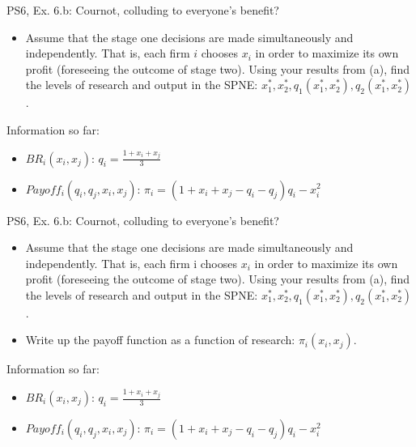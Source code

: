 \begin{frame}{PS6, Ex. 6.b: Cournot, colluding to everyone's benefit?}
    \begin{itemize}
    \item[(b)] Assume that the stage one decisions are made simultaneously and independently. That is, each firm $i$ chooses $x_i$ in order to maximize its own profit (foreseeing the outcome of stage two). Using your results from (a), find the levels of research and output in the SPNE: $x_1^*,x_2^*,q_1(x_1^*,x_2^*),q_2(x_1^*,x_2^*)$.
    \end{itemize}
  \begin{multicols}{2}
    \vfill\null \columnbreak
    Information so far:
    \begin{itemize}
    \item[1] $BR_i(x_i,x_j)$: $q_i = \frac{1+x_i+x_j}{3}$
    \item[2] $Payoff_i(q_i,q_j,x_i,x_j)$: $\pi_i=(1+x_i+x_j-q_i-q_j)q_i-x_i^2$
    \end{itemize}
    \vfill\null
  \end{multicols}
\end{frame}
\begin{frame}{PS6, Ex. 6.b: Cournot, colluding to everyone's benefit?}
    \begin{itemize}
    \item[(b)] Assume that the stage one decisions are made simultaneously and independently. That is, each firm i chooses $x_i$ in order to maximize its own profit (foreseeing the outcome of stage two). Using your results from (a), find the levels of research and output in the SPNE: $x_1^*,x_2^*,q_1(x_1^*,x_2^*),q_2(x_1^*,x_2^*)$.
    \end{itemize}
  \begin{multicols}{2}
    \begin{itemize}
      \item[(Step a)] Write up the payoff function as a function of research: $\pi_i(x_i,x_j)$.
    \end{itemize}
    \vfill\null \columnbreak
    Information so far:
    \begin{itemize}
    \item[1] $BR_i(x_i,x_j)$: $q_i = \frac{1+x_i+x_j}{3}$
    \item[2] $Payoff_i(q_i,q_j,x_i,x_j)$: $\pi_i=(1+x_i+x_j-q_i-q_j)q_i-x_i^2$
    \end{itemize}
    \vfill\null
  \end{multicols}
\end{frame}
